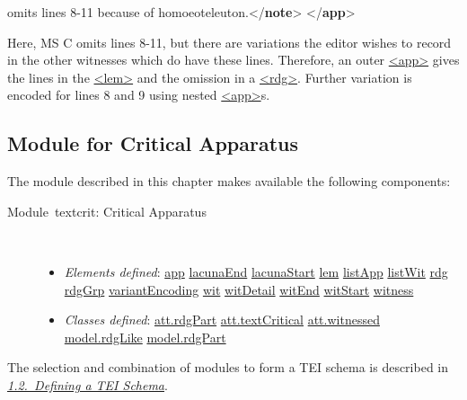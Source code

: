 \begin{shaded}
\mbox{}\newline 
{}\mbox{}\newline 
{}omits lines 8-11 because of homoeoteleuton.{</\textbf{note}>}\mbox{}\newline 
{</\textbf{app}>}\end{shaded}\egroup\par \noindent  Here, MS C omits lines 8-11, but there are variations the editor wishes to record in the other witnesses which do have these lines. Therefore, an outer \hyperref[TEI.app]{<app>} gives the lines in the \hyperref[TEI.lem]{<lem>} and the omission in a \hyperref[TEI.rdg]{<rdg>}. Further variation is encoded for lines 8 and 9 using nested \hyperref[TEI.app]{<app>}s.
\subsection[{Module for Critical Apparatus}]{Module for Critical Apparatus}\par
The module described in this chapter makes available the following components: \begin{description}

\item[{Module textcrit: Critical Apparatus}]\hspace{1em}\hfill\linebreak
\mbox{}\\[-10pt] \begin{itemize}
\item {\itshape Elements defined}: \hyperref[TEI.app]{app} \hyperref[TEI.lacunaEnd]{lacunaEnd} \hyperref[TEI.lacunaStart]{lacunaStart} \hyperref[TEI.lem]{lem} \hyperref[TEI.listApp]{listApp} \hyperref[TEI.listWit]{listWit} \hyperref[TEI.rdg]{rdg} \hyperref[TEI.rdgGrp]{rdgGrp} \hyperref[TEI.variantEncoding]{variantEncoding} \hyperref[TEI.wit]{wit} \hyperref[TEI.witDetail]{witDetail} \hyperref[TEI.witEnd]{witEnd} \hyperref[TEI.witStart]{witStart} \hyperref[TEI.witness]{witness}
\item {\itshape Classes defined}: \hyperref[TEI.att.rdgPart]{att.rdgPart} \hyperref[TEI.att.textCritical]{att.textCritical} \hyperref[TEI.att.witnessed]{att.witnessed} \hyperref[TEI.model.rdgLike]{model.rdgLike} \hyperref[TEI.model.rdgPart]{model.rdgPart}
\end{itemize} 
\end{description}  The selection and combination of modules to form a TEI schema is described in \textit{\hyperref[STIN]{1.2.\ Defining a TEI Schema}}.